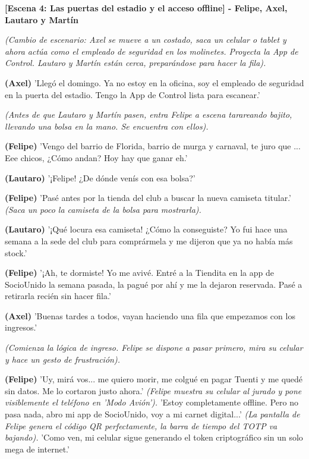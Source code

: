 \newpage

\textbf{[Escena 4: Las puertas del estadio y el acceso offline] - Felipe, Axel, Lautaro y Martín}

\textit{(Cambio de escenario: Axel se mueve a un costado, saca un celular o tablet y ahora actúa como el empleado de seguridad en los molinetes. Proyecta la App de Control. Lautaro y Martín están cerca, preparándose para hacer la fila).}

\textbf{(Axel)}
'Llegó el domingo. Ya no estoy en la oficina, soy el empleado de seguridad en la puerta del estadio. Tengo la App de Control lista para escanear.'

\textit{(Antes de que Lautaro y Martín pasen, entra Felipe a escena tarareando bajito, llevando una bolsa en la mano. Se encuentra con ellos).}

\textbf{(Felipe)}
'Vengo del barrio de Florida, barrio de murga y carnaval, te juro que ... Eee chicos, ¿Cómo andan? Hoy hay que ganar eh.'

\textbf{(Lautaro)}
'¡Felipe! ¿De dónde venís con esa bolsa?'

\textbf{(Felipe)}
'Pasé antes por la tienda del club a buscar la nueva camiseta titular.' \textit{(Saca un poco la camiseta de la bolsa para mostrarla).}

\textbf{(Lautaro)}
'¡Qué locura esa camiseta! ¿Cómo la conseguiste? Yo fui hace una semana a la sede del club para comprármela y me dijeron que ya no había más stock.'

\textbf{(Felipe)}
'¡Ah, te dormiste! Yo me avivé. Entré a la Tiendita en la app de SocioUnido la semana pasada, la pagué por ahí y me la dejaron reservada. Pasé a retirarla recién sin hacer fila.'

\textbf{(Axel)}
'Buenas tardes a todos, vayan haciendo una fila que empezamos con los ingresos.'

\textit{(Comienza la lógica de ingreso. Felipe se dispone a pasar primero, mira su celular y hace un gesto de frustración).}

\textbf{(Felipe)}
'Uy, mirá vos... me quiero morir, me colgué en pagar Tuenti y me quedé sin datos. Me lo cortaron justo ahora.'
\textit{(Felipe muestra su celular al jurado y pone visiblemente el teléfono en 'Modo Avión').}
'Estoy completamente offline. Pero no pasa nada, abro mi app de SocioUnido, voy a mi carnet digital...'
\textit{(La pantalla de Felipe genera el código QR perfectamente, la barra de tiempo del TOTP va bajando).}
'Como ven, mi celular sigue generando el token criptográfico sin un solo mega de internet.'

